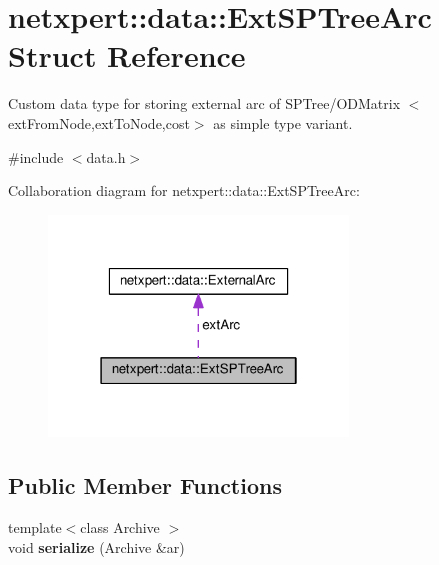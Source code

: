 \hypertarget{structnetxpert_1_1data_1_1ExtSPTreeArc}{}\section{netxpert\+:\+:data\+:\+:Ext\+S\+P\+Tree\+Arc Struct Reference}
\label{structnetxpert_1_1data_1_1ExtSPTreeArc}


Custom data type for storing external arc of S\+P\+Tree/\+O\+D\+Matrix $<$ext\+From\+Node,ext\+To\+Node,cost$>$ as simple type variant.  




{\ttfamily \#include $<$data.\+h$>$}



Collaboration diagram for netxpert\+:\+:data\+:\+:Ext\+S\+P\+Tree\+Arc\+:\nopagebreak
\begin{figure}[H]
\begin{center}
\leavevmode
\includegraphics[width=226pt]{structnetxpert_1_1data_1_1ExtSPTreeArc__coll__graph}
\end{center}
\end{figure}
\subsection*{Public Member Functions}
\begin{DoxyCompactItemize}
\item 
{\footnotesize template$<$class Archive $>$ }\\void {\bfseries serialize} (Archive \&ar)\hypertarget{structnetxpert_1_1data_1_1ExtSPTreeArc_a56e7f1d95674c14d505d897e2a34506b}{}\label{structnetxpert_1_1data_1_1ExtSPTreeArc_a56e7f1d95674c14d505d897e2a34506b}

\end{DoxyCompactItemize}
